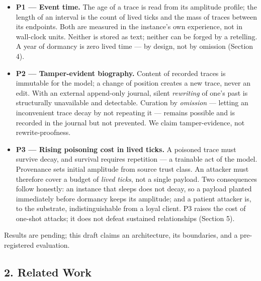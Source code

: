 \documentclass[
]{article}
\providecommand{\tightlist}{%
  \setlength{\itemsep}{0pt}\setlength{\parskip}{0pt}}
\begin{document}
\begin{itemize}
\tightlist
\item
  \textbf{P1 --- Event time.} The age of a trace is read from its
  amplitude profile; the length of an interval is the count of lived
  ticks and the mass of traces between its endpoints. Both are measured
  in the instance's own experience, not in wall-clock units. Neither is
  stored as text; neither can be forged by a retelling. A year of
  dormancy is zero lived time --- by design, not by omission (Section
  4).
\item
  \textbf{P2 --- Tamper-evident biography.} Content of recorded traces
  is immutable for the model; a change of position creates a new trace,
  never an edit. With an external append-only journal, silent
  \emph{rewriting} of one's past is structurally unavailable and
  detectable. Curation by \emph{omission} --- letting an inconvenient
  trace decay by not repeating it --- remains possible and is recorded
  in the journal but not prevented. We claim tamper-evidence, not
  rewrite-proofness.
\item
  \textbf{P3 --- Rising poisoning cost in lived ticks.} A poisoned trace
  must survive decay, and survival requires repetition --- a trainable
  act of the model. Provenance sets initial amplitude from source trust
  class. An attacker must therefore cover a budget of \emph{lived
  ticks}, not a single payload. Two consequences follow honestly: an
  instance that sleeps does not decay, so a payload planted immediately
  before dormancy keeps its amplitude; and a patient attacker is, to the
  substrate, indistinguishable from a loyal client. P3 raises the cost
  of one-shot attacks; it does not defeat sustained relationships
  (Section 5).
\end{itemize}

Results are pending; this draft claims an architecture, its boundaries,
and a pre-registered evaluation.

\subsection{2. Related Work}\label{related-work}
\end{document}
